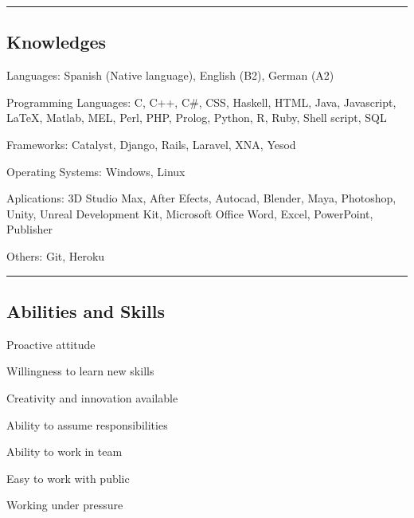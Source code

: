 \documentclass[10pt,letterpaper]{article}
\newenvironment{indentsection}[1]%
{\begin{list}{}%
	{\setlength{\leftmargin}{#1}}%
	\item[]%
}
{\end{list}}
\begin{document}

\hrule
\vspace{-0.4em}
\subsection*{Knowledges}

\begin{indentsection}{\parindent}
\begin{description*}
	
\item[Languages:]
  Spanish (Native language), English (B2), German (A2)
\item[Programming Languages:]
  C, C++, C\#, CSS, Haskell, HTML, Java, Javascript, \LaTeX, Matlab, MEL, Perl, PHP, Prolog, Python, R, Ruby, Shell script, SQL
\item[Frameworks:]
  Catalyst, Django, Rails, Laravel, XNA, Yesod
\item[Operating Systems:]
  Windows, Linux
\item[Aplications:]
  3D Studio Max, After Efects, Autocad, Blender, Maya, Photoshop, Unity, Unreal Development Kit, Microsoft Office Word, Excel, PowerPoint, Publisher
\item[Others:]
  Git, Heroku
  
\end{description*}
\end{indentsection}


\hrule
\vspace{-0.4em}
\subsection*{Abilities and Skills}

\begin{indentsection}{\parindent}
\begin{description*}

\item
  Proactive attitude
\item
  Willingness to learn new skills
\item
  Creativity and innovation available
\item
  Ability to assume responsibilities
\item
  Ability to work in team
\item
  Easy to work with public
\item
  Working under pressure

\end{description*}
\end{indentsection}
\end{document}

